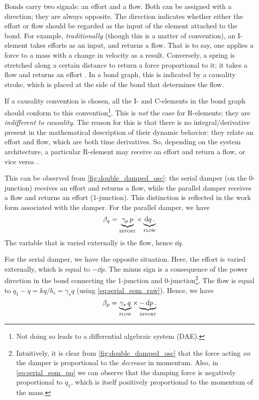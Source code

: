 Bonds carry two signals: an effort and a flow. Both can be assigned with a direction; they are always opposite. The direction indicates whether either the effort or flow should be regarded as the input of the element attached to the bond. For example, \emph{traditionally} (though this is a matter of convention), an I-element takes efforts as an input, and returns a flow. That is to say, one applies a force to a mass with a change in velocity as a result. Conversely, a spring is stretched along a certain distance to return a force proportional to it; it takes a flow and returns an effort \cite{Borutzky2010}. In a bond graph, this is indicated by a causality stroke, which is placed at the side of the bond that determines the flow.

If a causality convention is chosen, all the I- and C-elements in the bond graph should conform to this convention\footnote{Not doing so leads to a differential algebraic system (DAE).}. This is \emph{not} the case for R-elements; they are \emph{indifferent to causality}. The reason for this is that there is no integral/derivative present in the mathematical description of their dynamic behavior: they relate an effort and flow, which are both time derivatives. So, depending on the system architecture, a particular R-element may receive an effort and return a flow, or vice versa \cite{Borutzky2010}.

This can be observed from \cref{fig:double_damped_osc}: the serial damper (on the 0-junction) receives an effort and returns a flow, while the parallel damper receives a flow and returns an effort (1-junction). This distinction is reflected in the work form associated with the damper. For the parallel damper, we have
\begin{equation}
     \beta_q = \underbrace{\gamma_p \,p}_\text{\textsc{effort}} \times \underbrace{\dd{q}.}_\text{\textsc{flow}}
\end{equation}
The variable that is varied externally is the flow, hence \(\dd{q}\).

For the serial damper, we have the opposite situation. Here, the effort is varied externally, which is equal to \(-\dd{p}\). The minus sign is a consequence of the power direction in the bond connecting the 1-junction and 0-junction\footnote{Intuitively, it is clear from \cref{fig:double_damped_osc} that the force acting \emph{on} the damper is proportional to the \emph{decrease} in momentum. Also, in \cref{eq:serial_eom_pq} we can observe that the damping force is negatively proportional to \(\dot{q}_1\), which is itself positively proportional to the momentum of the mass.}. The flow is equal to \(\dot{q}_1 - \dot{q} = kq/b_s = \gamma_s q\) (using \cref{eq:serial_eom_raw}). Hence, we have
\begin{equation}
     \beta_p = \underbrace{\gamma_s\, q}_\text{\textsc{flow}} \times \underbrace{-\dd{p}.}_\text{\textsc{effort}}
\end{equation}

